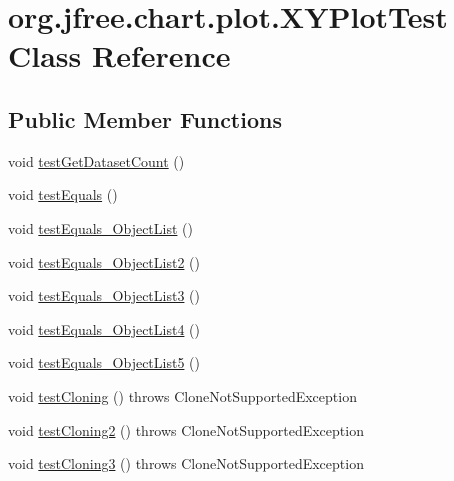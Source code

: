 \hypertarget{classorg_1_1jfree_1_1chart_1_1plot_1_1_x_y_plot_test}{}\section{org.\+jfree.\+chart.\+plot.\+X\+Y\+Plot\+Test Class Reference}
\label{classorg_1_1jfree_1_1chart_1_1plot_1_1_x_y_plot_test}
\subsection*{Public Member Functions}
\begin{DoxyCompactItemize}
\item 
void \mbox{\hyperlink{classorg_1_1jfree_1_1chart_1_1plot_1_1_x_y_plot_test_a7e843508619c2fc6d9750b76f2bbeea4}{test\+Get\+Dataset\+Count}} ()
\item 
void \mbox{\hyperlink{classorg_1_1jfree_1_1chart_1_1plot_1_1_x_y_plot_test_ac44b70fc2f042be587129586b9a4a5c3}{test\+Equals}} ()
\item 
void \mbox{\hyperlink{classorg_1_1jfree_1_1chart_1_1plot_1_1_x_y_plot_test_ad3300212443b1b384c06d343b4e5e026}{test\+Equals\+\_\+\+Object\+List}} ()
\item 
void \mbox{\hyperlink{classorg_1_1jfree_1_1chart_1_1plot_1_1_x_y_plot_test_a142e2a1fc0d4f4185444e0130f6da578}{test\+Equals\+\_\+\+Object\+List2}} ()
\item 
void \mbox{\hyperlink{classorg_1_1jfree_1_1chart_1_1plot_1_1_x_y_plot_test_a35ffb6239a0a413c0b36d8d1abe44719}{test\+Equals\+\_\+\+Object\+List3}} ()
\item 
void \mbox{\hyperlink{classorg_1_1jfree_1_1chart_1_1plot_1_1_x_y_plot_test_a6e9dc351742b1fcd98596e218f371c5c}{test\+Equals\+\_\+\+Object\+List4}} ()
\item 
void \mbox{\hyperlink{classorg_1_1jfree_1_1chart_1_1plot_1_1_x_y_plot_test_a92d349f9bff874bb1c2cd16c0e0dcb2d}{test\+Equals\+\_\+\+Object\+List5}} ()
\item 
void \mbox{\hyperlink{classorg_1_1jfree_1_1chart_1_1plot_1_1_x_y_plot_test_a84e0afa7c32f5185deb6823447da461f}{test\+Cloning}} ()  throws Clone\+Not\+Supported\+Exception 
\item 
void \mbox{\hyperlink{classorg_1_1jfree_1_1chart_1_1plot_1_1_x_y_plot_test_acd075b0d917ad59ed257893909d44af6}{test\+Cloning2}} ()  throws Clone\+Not\+Supported\+Exception 
\item 
void \mbox{\hyperlink{classorg_1_1jfree_1_1chart_1_1plot_1_1_x_y_plot_test_a848a0072a5efc66e8581372f8ce39ea1}{test\+Cloning3}} ()  throws Clone\+Not\+Supported\+Exception 

\end{DoxyCompactItemize}
